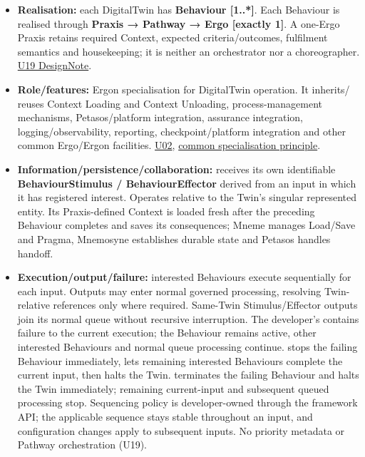 \begin{itemize}


\item \textbf{Realisation:} each DigitalTwin has \textbf{Behaviour [1..*]}. Each Behaviour is
  realised through \textbf{Praxis → Pathway → Ergo [exactly 1]}. A one-Ergo Praxis
  retains required Context, expected criteria/outcomes, fulfilment semantics and
  housekeeping; it is neither an orchestrator nor a choreographer.
  \href{\detokenize{../../../../../../../../../docs/markdown/05-information-systems-architecture/design-notes/DesignNote-Digital-Twin-Behaviour-and-Execution-Semantics.md}}{U19 DesignNote}.

\item \textbf{Role/features:} Ergon specialisation for DigitalTwin operation. It inherits/
  reuses Context Loading and Context Unloading, process-management mechanisms,
  Petasos/platform integration, assurance integration, logging/observability,
  reporting, checkpoint/platform integration and other common Ergo/Ergon facilities.
  \href{\detokenize{../../../../../../../../../docs/markdown/05-information-systems-architecture/sources.md#u02}}{U02}, \href{\detokenize{../../../../../../../../../docs/markdown/05-information-systems-architecture/README.md#specialisation-principle}}{common specialisation principle}.

\item \textbf{Information/persistence/collaboration:} receives its own identifiable
  \textbf{BehaviourStimulus / BehaviourEffector} derived from an input in which it has
  registered interest. Operates relative to the Twin's singular represented
  entity. Its Praxis-defined Context is loaded fresh after the preceding
  Behaviour completes and saves its consequences; Mneme manages Load/Save and
  Pragma, Mnemosyne establishes durable state and Petasos handles handoff.

\item \textbf{Execution/output/failure:} interested Behaviours execute sequentially for
  each input. Outputs may enter normal governed processing, resolving Twin-relative
  references only where required. Same-Twin Stimulus/Effector outputs join its
  normal queue without recursive interruption. The developer's
  \texttt{} contains failure to the current execution; the
  Behaviour remains active, other interested Behaviours and normal queue processing
  continue. \texttt{} stops the failing Behaviour immediately,
  lets remaining interested Behaviours complete the current input, then halts
  the Twin. \texttt{} terminates the failing Behaviour and halts
  the Twin immediately; remaining current-input and subsequent queued processing
  stop. Sequencing policy is developer-owned through the framework API; the
  applicable sequence stays stable throughout an input, and configuration changes
  apply to subsequent inputs. No priority metadata or Pathway orchestration (U19).


\end{itemize}
